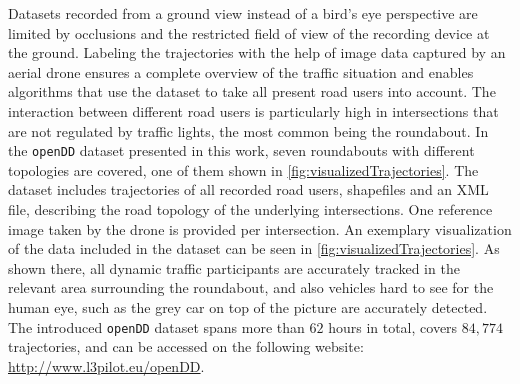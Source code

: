 \documentclass[a4paper, 10pt, conference]{ieeeconf}      %
\begin{document}
Datasets recorded from a ground view instead of a bird's eye perspective are limited by occlusions and the restricted field of view of the recording device at the ground.
Labeling the trajectories with the help of image data captured by an aerial drone ensures a complete overview of the traffic situation and enables algorithms that use the dataset to take all present road users into account.
The interaction between different road users is particularly high in intersections that are not regulated by traffic lights, the most common being the roundabout.
In the \texttt{openDD} dataset presented in this work, seven roundabouts with different topologies are covered, one of them shown in \autoref{fig:visualizedTrajectories}.
The dataset includes trajectories of all recorded road users, shapefiles and an \gls{XML} file, describing the road topology of the underlying intersections.
One reference image taken by the drone is provided per intersection.
An exemplary visualization of the data included in the dataset can be seen in \autoref{fig:visualizedTrajectories}.
As shown there, all dynamic traffic participants are accurately tracked in the relevant area surrounding the roundabout, and also vehicles hard to see for the human eye, such as the grey car on top of the picture are accurately detected.
The introduced \texttt{openDD} dataset spans more than $62$ hours in total, covers $84,774$ trajectories, and can be accessed on the following website: \mbox{\url{http://www.l3pilot.eu/openDD}}.
\end{document}
